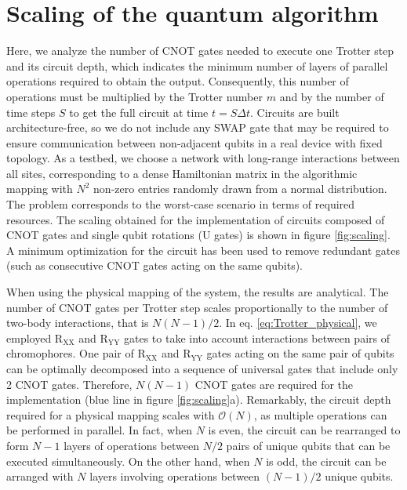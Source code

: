 \documentclass[12pt, amsmath, amssymb, graphicx]{iopart}
\begin{document}
\section{Scaling of the quantum algorithm} \label{app:scaling}
Here, we analyze the number of CNOT gates needed to execute one Trotter step and its circuit depth, which indicates the minimum number of layers of parallel operations required to obtain the output.
Consequently, this number of operations must be multiplied by the Trotter number $m$ and by the number of time steps $S$ to get the full circuit at time $t = S \Delta t$.
Circuits are built architecture-free, so we do not include any SWAP gate that may be required to ensure communication between non-adjacent qubits in a real device with fixed topology.
As a testbed, we choose a network with long-range interactions between all sites, corresponding to a dense Hamiltonian matrix in the algorithmic mapping with $N^2$ non-zero entries randomly drawn from a normal distribution.
The problem corresponds to the worst-case scenario in terms of required resources.
The scaling obtained for the implementation of circuits composed of CNOT gates and single qubit rotations (U gates) is shown in figure \ref{fig:scaling}. A minimum optimization for the circuit has been used to remove redundant gates (such as consecutive CNOT gates acting on the same qubits).

When using the physical mapping of the system, the results are analytical.
The number of CNOT gates per Trotter step scales proportionally to the number of two-body interactions, that is $N(N - 1)/2$.
In eq. \ref{eq:Trotter_physical}, we employed $\text{R}_\text{XX}$ and $\text{R}_\text{YY}$ gates to take into account interactions between pairs of chromophores.
One pair of $\text{R}_\text{XX}$ and $\text{R}_\text{YY}$ gates acting on the same pair of qubits can be optimally decomposed into a sequence of universal gates that include only 2 CNOT gates.
Therefore, $N(N-1)$ CNOT gates are required for the implementation (blue line in figure \ref{fig:scaling}a).
Remarkably, the circuit depth required for a physical mapping scales with $\mathcal{O}(N)$, as multiple operations can be performed in parallel. In fact, when $N$ is even, the circuit can be rearranged to form $N-1$ layers of operations between $N/2$ pairs of unique qubits that can be executed simultaneously.
On the other hand, when $N$ is odd, the circuit can be arranged with $N$ layers involving operations between $(N-1)/2$ unique qubits.
\end{document}
